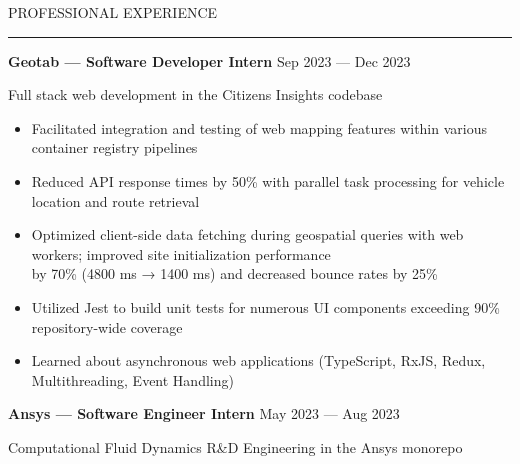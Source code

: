 \documentclass[9pt]{extarticle}
\begin{document}
\vspace{5pt}

\begin{adjustwidth}{4pt}{4pt} \large {\selectfont PROFESSIONAL EXPERIENCE} \end{adjustwidth}
\rule[8pt]{\linewidth}{0.4pt}

\begin{adjustwidth}{10pt}{10pt}
	\vspace{-5pt}

	\textcolor{imptextblack}{\textbf{\large Geotab — Software Developer Intern}} \hfill Sep 2023 — Dec 2023
	
	Full stack web development in the Citizens Insights codebase
	
	\begin{itemize}[topsep=0pt, labelsep=10pt, leftmargin=24pt, label=\textcolor{imptextblack}{\textbullet}]
	  	\item Facilitated integration and testing of web mapping features within various container registry pipelines
		\item Reduced API response times by \textcolor{imptextblack}{50\%} with parallel task processing for vehicle location and route retrieval
		\item Optimized client-side data fetching during geospatial queries with web workers; improved site initialization performance \\
			by \textcolor{imptextblack}{70\% ({\small 4800 ms → 1400 ms})} and decreased bounce rates by \textcolor{imptextblack}{25\%} 
		\item Utilized Jest to build unit tests for numerous UI components exceeding \textcolor{imptextblack}{90\%} repository-wide coverage
		\item Learned about \textcolor{imptextblack}{asynchronous} web applications ({\small TypeScript, RxJS, Redux, Multithreading, Event Handling})
	\end{itemize}
	
	\vspace{5pt}
	\textcolor{imptextblack}{\textbf{\large Ansys — Software Engineer Intern}} \hfill May 2023 — Aug 2023
	
	Computational Fluid Dynamics R\&D Engineering in the Ansys monorepo
	

\end{adjustwidth}
\end{document}

